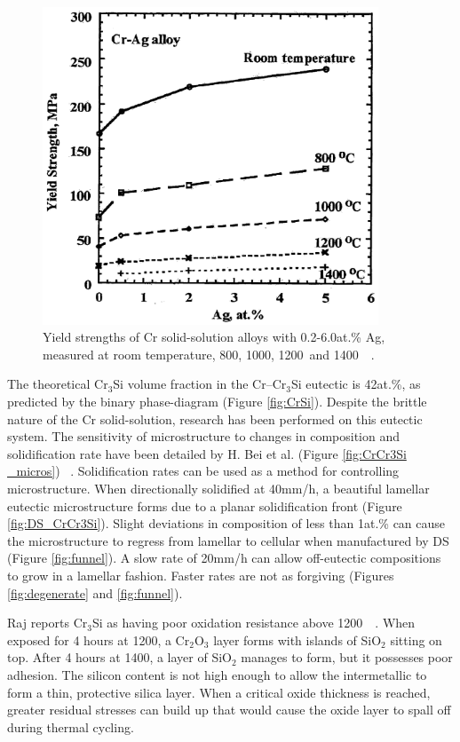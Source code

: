 \begin{figure}[H]
\begin{center}
\includegraphics[width=10cm]{crag}
\caption{Yield strengths of Cr solid-solution alloys with 0.2-6.0at.\% Ag, measured at room temperature, 800\celsius, 1000\celsius, 1200\celsius\ and 1400\celsius\ ~\cite{gu07}.}\label{fig:crag}
\end{center}
\end{figure}
%
\clearpage
The theoretical Cr$_3$Si volume fraction in the Cr--Cr$_3$Si eutectic is 42at.\%, as predicted by the binary phase-diagram (Figure \ref{fig:CrSi}).  Despite the brittle nature of the Cr solid-solution, research has been performed on this eutectic system.  The sensitivity of microstructure to changes in composition and solidification rate have been detailed by H.  Bei et al. (Figure \ref{fig:CrCr3Si _micros}) ~\cite{bei03a}.  Solidification rates can be used as a method for controlling microstructure.   When directionally solidified at 40mm/h, a beautiful lamellar eutectic microstructure forms due to a planar solidification front (Figure \ref{fig:DS_CrCr3Si}).  Slight deviations in composition of less than 1at.\% can cause the microstructure to regress from lamellar to cellular when manufactured by DS (Figure \ref{fig:funnel}).  A slow rate of 20mm/h can  allow off-eutectic compositions to grow in a lamellar fashion.  Faster rates are not as forgiving (Figures \ref{fig:degenerate} and \ref{fig:funnel}).

Raj reports Cr$_3$Si as having poor oxidation resistance above 1200\celsius\ ~\cite{raj95}.  When exposed for 4 hours at 1200\celsius, a Cr$_2$O$_3$ layer forms with islands of SiO$_2$ sitting on top.  After 4 hours at 1400\celsius, a layer of SiO$_2$ manages to form, but it possesses poor adhesion.  The silicon content is not high enough to allow the intermetallic to form a thin, protective silica layer.  When a critical oxide thickness is reached, greater residual stresses can build up that would cause the oxide layer to spall off during thermal cycling. 

